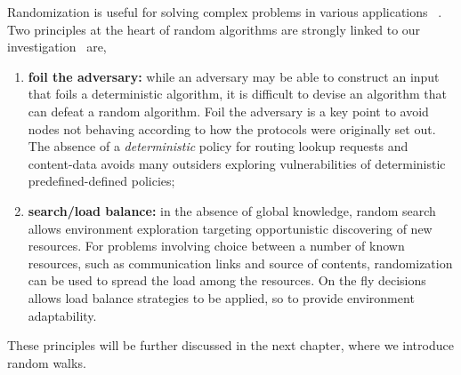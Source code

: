 Randomization is useful for solving complex problems in various applications ~\cite{mitzenmatcher}.  
Two principles at the heart of random algorithms are strongly linked to our investigation~\cite{motwani} are,
\begin{enumerate}
\item \textbf{foil the adversary:} while an adversary may be able to construct an input that foils a
deterministic algorithm, it is difficult to devise an algorithm that can defeat a
random algorithm. Foil the adversary is a key point to avoid nodes not behaving according to how the
protocols were originally set out. The absence of a \emph{deterministic}
policy for routing lookup requests and content-data avoids many outsiders exploring vulnerabilities
of deterministic predefined-defined policies;
\item \textbf{search/load balance:} in the absence of global knowledge, random search allows environment exploration
targeting opportunistic discovering of new resources. For problems involving choice between a number of known resources, 
such as communication links and source of contents, randomization can be used to spread the load among the resources. 
On the fly decisions allows load balance strategies to be applied, so to provide environment adaptability.
\end{enumerate}
These principles will be further discussed in the next chapter, where we introduce random walks. 





